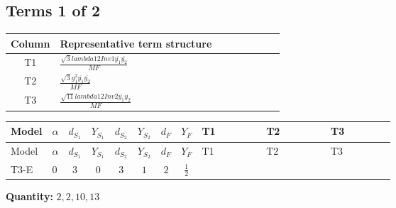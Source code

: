 \documentclass[8pt]{article}
\begin{document}
\begin{landscape}
\subsection*{Terms 1 of 2}
\begin{center}
\begin{tabular}{@{}c >{\raggedright\arraybackslash}p{0.82\linewidth}@{}}
\toprule
Column & Representative term structure \\
\midrule
T1 & \(\displaystyle \frac{\sqrt{3} lambda12Inv1 \overline{y_{1}} \overline{y_{2}}}{MF}\) \\
\midrule
T2 & \(\displaystyle \frac{\sqrt{3} g_{1}^{2} \overline{y_{1}} \overline{y_{2}}}{MF}\) \\
\midrule
T3 & \(\displaystyle \frac{\sqrt{11} lambda12Inv2 \overline{y_{1}} \overline{y_{2}}}{MF}\) \\
\midrule
\bottomrule
\end{tabular}
\end{center}
\smallskip
\tiny
\begin{longtable}{@{}llcccccc >{\raggedright\arraybackslash}p{0.21\linewidth} >{\raggedright\arraybackslash}p{0.21\linewidth} >{\raggedright\arraybackslash}p{0.21\linewidth}@{}}
\toprule
Model & $\alpha$ & $d_{S_1}$ & $Y_{S_1}$ & $d_{S_2}$ & $Y_{S_2}$ & $d_F$ & $Y_F$ & T1 & T2 & T3 \\
\midrule
\endfirsthead
\toprule
Model & $\alpha$ & $d_{S_1}$ & $Y_{S_1}$ & $d_{S_2}$ & $Y_{S_2}$ & $d_F$ & $Y_F$ & T1 & T2 & T3 \\
\midrule
\endhead
T3-E & $0$ & $3$ & $0$ & $3$ & $1$ & $2$ & $\frac{1}{2}$ & \scriptsize\adjustbox{max width=\linewidth}{$\begin{gathered} - \frac{\sqrt{3} lambda12Inv1 \overline{y_{1}} \overline{y_{2}}}{6 MF}\end{gathered}$} & \scriptsize\adjustbox{max width=\linewidth}{$\begin{gathered} \frac{\sqrt{3} g_{1}^{2} \overline{y_{1}} \overline{y_{2}}}{8 MF}\end{gathered}$} & \scriptsize\adjustbox{max width=\linewidth}{$\begin{gathered} \frac{3 \sqrt{11} lambda12Inv2 \overline{y_{1}} \overline{y_{2}}}{22 MF}\end{gathered}$} \\
\midrule
\bottomrule
\end{longtable}
\clearpage
\noindent\textbf{Quantity: }$\mathrm{2,2,10,13}$\par\smallskip

\end{landscape}
\end{document}
